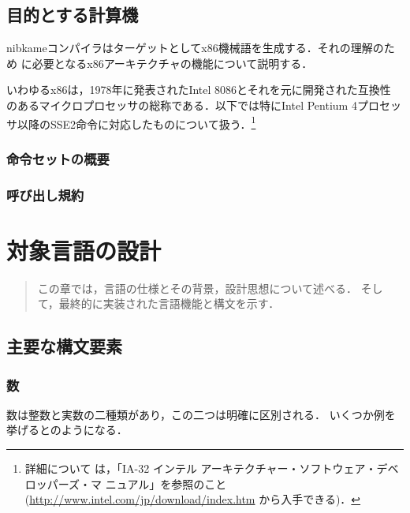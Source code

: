 \documentclass[a4paper,titlepage,report]{jsbook}
\begin{document}
\section{目的とする計算機}\label{sc:target-machine}
nibkameコンパイラはターゲットとしてx86機械語を生成する．それの理解のため
に必要となるx86アーキテクチャの機能について説明する．

いわゆるx86は，1978年に発表されたIntel 8086とそれを元に開発された互換性
のあるマイクロプロセッサの総称である．以下では特にIntel Pentium 4プロセッ
サ以降のSSE2命令に対応したものについて扱う．\footnote{詳細について
は，「IA-32 インテル アーキテクチャー・ソフトウェア・デベロッパーズ・マ
ニュアル」を参照のこと(\url{http://www.intel.com/jp/download/index.htm}
から入手できる)．}

\subsection{命令セットの概要}\label{ssc:instruction_set}

\subsection{呼び出し規約}\label{ssc:calling-convention}

\chapter{対象言語の設計}\label{ch:lang_design}

\begin{abstract}
この章では，言語の仕様とその背景，設計思想について述べる．
そして，最終的に実装された言語機能と構文を示す．
\end{abstract}

\section{主要な構文要素}\label{sc:syntax-element}
\subsection{数}\label{sc:syntax-number}
数は整数と実数の二種類があり，この二つは明確に区別される．
いくつか例を挙げるとのようになる．
\end{document}
